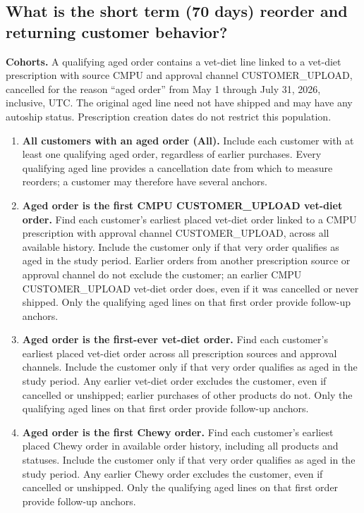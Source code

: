 \subsection{What is the short term (70 days) reorder and returning customer behavior?}
\label{subsec:medium-term-reorder-behavior}
\noindent\textbf{Cohorts.}
A qualifying aged order contains a
vet-diet line linked to a vet-diet prescription with source CMPU and approval
channel CUSTOMER\_UPLOAD, cancelled for the reason ``aged order'' from
May 1 through July 31, 2026, inclusive, UTC. The original aged line need not
have shipped and may have any autoship status. Prescription creation dates
do not restrict this population.

\begin{enumerate}
\item \textbf{All customers with an aged order (All).} Include each customer
with at least one qualifying aged order, regardless of earlier purchases.
Every qualifying aged line provides a cancellation date from which to
measure reorders; a customer may therefore have several anchors.

\item \textbf{Aged order is the first CMPU CUSTOMER\_UPLOAD vet-diet
order.} Find each customer's earliest placed vet-diet order linked to a
CMPU prescription with approval channel CUSTOMER\_UPLOAD, across all
available history. Include the customer only if that very order qualifies
as aged in the study period. Earlier orders from another prescription
source or approval channel do not exclude the customer; an earlier CMPU
CUSTOMER\_UPLOAD vet-diet order does, even if it was cancelled or never
shipped. Only the qualifying aged lines on that first order provide
follow-up anchors.

\item \textbf{Aged order is the first-ever vet-diet order.} Find each
customer's earliest placed vet-diet order across all prescription sources
and approval channels. Include the customer only if that very order
qualifies as aged in the study period. Any earlier vet-diet order excludes
the customer, even if cancelled or unshipped; earlier purchases of other
products do not. Only the qualifying aged lines on that first order
provide follow-up anchors.

\item \textbf{Aged order is the first Chewy order.} Find each customer's
earliest placed Chewy order in available order history, including all
products and statuses. Include the customer only if that very order
qualifies as aged in the study period. Any earlier Chewy order excludes
the customer, even if cancelled or unshipped. Only the qualifying aged
lines on that first order provide follow-up anchors.
\end{enumerate}

